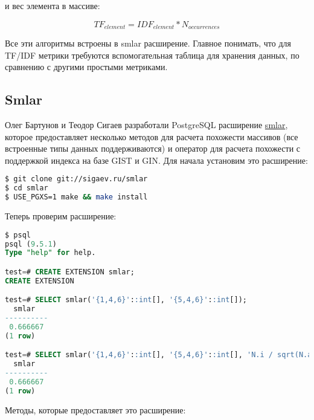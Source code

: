и вес элемента в массиве:

\begin{equation}
 \label{eq:smlar6}
 TF_{element} = IDF_{element} * N_{occurrences}
\end{equation}

Все эти алгоритмы встроены в smlar расширение. Главное понимать, что для TF/IDF метрики требуются вспомогательная таблица для хранения данных, по сравнению с другими простыми метриками.

\subsection{Smlar}

Олег Бартунов и Теодор Сигаев разработали PostgreSQL расширение \href{http://sigaev.ru/git/gitweb.cgi?p=smlar.git;a=blob;hb=HEAD;f=README}{smlar}, которое предоставляет несколько методов для расчета похожести массивов (все встроенные типы данных поддерживаются) и оператор для расчета похожести с поддержкой индекса на базе GIST и GIN. Для начала установим это расширение:

\begin{lstlisting}[language=Bash,label=lst:smlar1,caption=Установка smlar]
$ git clone git://sigaev.ru/smlar
$ cd smlar
$ USE_PGXS=1 make && make install
\end{lstlisting}

Теперь проверим расширение:

\begin{lstlisting}[language=SQL,label=lst:smlar4,caption=Проверка smlar]
$ psql
psql (9.5.1)
Type "help" for help.

test=# CREATE EXTENSION smlar;
CREATE EXTENSION

test=# SELECT smlar('{1,4,6}'::int[], '{5,4,6}'::int[]);
  smlar
----------
 0.666667
(1 row)

test=# SELECT smlar('{1,4,6}'::int[], '{5,4,6}'::int[], 'N.i / sqrt(N.a * N.b)' );
  smlar
----------
 0.666667
(1 row)
\end{lstlisting}

Методы, которые предоставляет это расширение:

